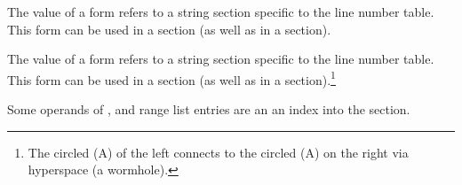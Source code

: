 \begin{description}
The value of a \DWFORMlinestrp{} form refers to a
string section specific to the line number table.
This form can be used in a \dotdebugline{} section
(as well as in a \dotdebuginfo{} section).

The value of a \DWFORMlinestrp{} form refers to a
string section specific to the line number table.
This form can be used in a \dotdebuginfo{} section
(as well as in a \dotdebugline{} section).\footnote{
\bb
The circled (A) of the left connects to the circled
(A) on the right 
\eb
via hyperspace (a wormhole).}

\bb
Some operands of \DWRLEbaseaddressx, \DWRLEstartxendx{} and 
\DWRLEstartxlength{} range list entries are an 
an index into the \dotdebugaddr{} section.
\eb

\end{description}



